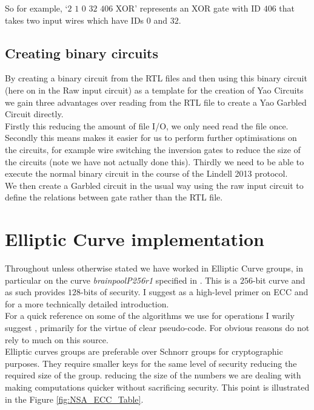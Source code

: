 \documentclass[ %
                    author={Nicholas Tutte},
                supervisor={Prof. Nigel Smart},
                    degree={MEng},
                     title={Secure Two Party Computation},
                  subtitle={A practical comparison of recent protocols},
                      type={Research - GG1K},
                      year={2015} ]{dissertation}
\begin{document}
\begin{appendices}
					So for example, `$2$ $1$ $0$ $32$ $406$ XOR' represents an XOR gate with ID $406$ that takes two input wires which have IDs $0$ and $32$.

				\subsection{Creating binary circuits}
					By creating a binary circuit from the RTL files and then using this binary circuit (here on in the Raw input circuit) as a template for the creation of Yao Circuits we gain three advantages over reading from the RTL file to create a Yao Garbled Circuit directly.\\

					Firstly this reducing the amount of file I/O, we only need read the file once. Secondly this means makes it easier for us to perform further optimisations on the circuits, for example wire switching the inversion gates to reduce the size of the circuits (note we have not actually done this). Thirdly we need to be able to execute the normal binary circuit in the course of the Lindell 2013 protocol.\\

					We then create a Garbled circuit in the usual way using the raw input circuit to define the relations between gate rather than the RTL file.

			\section{Elliptic Curve implementation}

				Throughout unless otherwise stated we have worked in Elliptic Curve groups, in particular on the curve \emph{brainpoolP256r1} specified in \cite{BrainpoolSpecifications}. This is a $256$-bit curve and as such provides $128$-bits of security. I suggest \cite{ECC_Primer} as a high-level primer on ECC and \cite{ECC_RFC_6090} for a more technically detailed introduction.\\

				For a quick reference on some of the algorithms we use for operations I warily suggest \cite{Wiki_ECC}, primarily for the virtue of clear pseudo-code. For obvious reasons do not rely to much on this source.\\

				Elliptic curves groups are preferable over Schnorr groups for cryptographic purposes. They require smaller keys for the same level of security reducing the required size of the group. reducing the size of the numbers we are dealing with making computations quicker without sacrificing security. This point is illustrated in the Figure \ref{fig:NSA_ECC_Table}.\\


\end{appendices}
\end{document}
